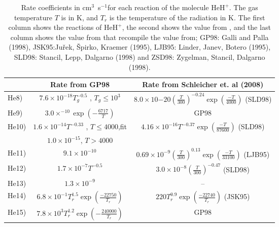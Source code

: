 \documentclass[baaa]{baaa}
\begin{document}
\begin{table*}[!t]
    \centering
    \begin{tabular}{lcc} 
         \hline\hline\noalign{\smallskip}
         &  Rate from GP98 & Rate from Schleicher et. al (2008)\\
         \hline\noalign{\smallskip}
He8) & $7.6\times 10^{-18}T_g^{-0.5}$ , $T_g \leq 10^3$ & $8.0 \times 10{-20} \left( \frac{T}{300} \right)^{-0.24} \exp \left( \frac{-T}{4000}\right)$ (SLD98) \\


He9) &  $3.0 \times ^{-10} \exp \left( -\frac{6717}{T} \right)$ & GP98 \\

He10) &  $1.6 \times 10^{-14} T^{-0.33}$ , $T \leq 4000$,fit   &  $4.16 \times 10^{-16} T^{-0.37} \exp \left( \frac{-T}{87600}\right)$ (SLD98) \\
&  $1.0 \times 10^{-15}$,  $T > 4000$  & \\

He11)& $9.1 \times 10^{-10}$ & $0.69 \times 10 ^{-9} \left( \frac{T}{300} \right)^{0.13} \exp \left( \frac{-T}{33100}\right)$ (LJB95)\\

He12) & $1.7 \times 10^{-7} T^{-0.5}$  & $3.0 \times 10^{-8} \left( \frac{T}{300} \right)^{-0.47}$ (SLD98) \\

He13) & $1.3\times 10^{-9}$ & -- \\
He14) & $6.8 \times 10^{-1} T_{r}^{1.5} \exp \left( \frac{-22750}{T_r}\right)$  & $220 T_r^{0.9} \exp \left( \frac{-22740}{T_r}\right)$ (JSK95) \\

He15)  & $7.8 \times 10^{3} T_r^{1.2} \exp \left( -\frac{240000}{T_r}\right)$ & GP98 \\ \hline
    \end{tabular}
    
    \caption{Rate coefficients in cm$^3$~s$^{-1}$for each reaction of the molecule $\mathrm{HeH^+}$. The gas temperature $T$ is in $\mathrm{K}$, and $T_r$ is the temperature of the radiation in $\mathrm{K}$. The first column shows the reactions of $\mathrm{HeH^+}$, the second shows the value from \citet{GP98}, and the last column shows the value from \citet{Schleicher2008} that recompile the value from;  GP98: Galli and Palla (1998), JSK95:Juřek, Špirko, Kraemer (1995), LJB95: Linder, Janev, Botero (1995), SLD98: Stancil, Lepp, Dalgarno (1998) and ZSD98: Zygelman, Stancil, Dalgarno (1998). }
    \label{RateCoeffHEH+}
\end{table*}
\end{document}
